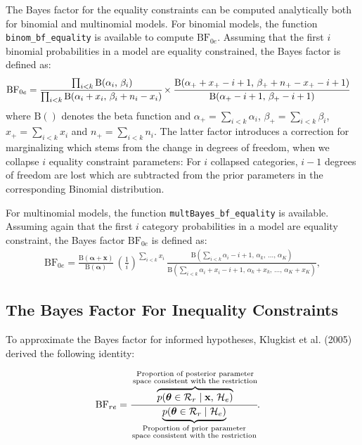 \documentclass[
  english,
  man,floatsintext]{apa6}
\begin{document}
The Bayes factor for the equality constraints can be computed analytically both for binomial and multinomial models. For binomial models, the function \texttt{binom\_bf\_equality} is available to compute \(\text{BF}_{0e}\). Assuming that the first \(i\) binomial probabilities in a model are equality constrained, the Bayes factor is defined as:
\begin{align*}
\text{BF}_{0e}
&= \cfrac{\prod_{i < k} \text{B}(\alpha_i\text{, } \beta_i)}{\prod_{i < k} \text{B}(\alpha_i + x_i\text{, } \beta_i + n_i - x_i)} \times \cfrac{\text{B}(\alpha_+ + x_+ - i + 1\text{, } \beta_+ + n_+ - x_+ - i + 1)}{\text{B}(\alpha_+ - i + 1\text{, }\beta_+ - i + 1)}
\end{align*}
where \(\text{B}()\) denotes the beta function and \(\alpha_+ = \sum_{i<k}\alpha_i\), \(\beta_+ = \sum_{i<k}\beta_i\), \(x_+ = \sum_{i<k} x_i\) and \(n_+ = \sum_{i<k} n_i\). The latter factor introduces a correction for marginalizing which stems from the change in degrees of freedom, when we collapse \(i\) equality constraint parameters: For \(i\) collapsed categories, \(i - 1\) degrees of freedom are lost which are subtracted from the prior parameters in the corresponding Binomial distribution.

For multinomial models, the function \texttt{multBayes\_bf\_equality} is available. Assuming again that the first \(i\) category probabilities in a model are equality constraint, the Bayes factor \(\text{BF}_{0e}\) is defined as:
\begin{align*}
\text{BF}_{0e} = \frac{\text{B}(\boldsymbol{\alpha}+\mathbf{x})}{\text{B}(\boldsymbol{\alpha})} \, \left(\frac{1}{i}\right)^{\sum_{i<k} x_i}\,\frac{
 \text{B}\left(\sum_{i<k}\alpha_i - i + 1\text{, }\alpha_{k}\text{, }\dots\text{, }\alpha_K\right)}{\text{B}\left(\sum_{i<k}\alpha_i+x_i - i + 1\text{, }\alpha_{k}+x_{k}\text{, }\dots\text{, }\alpha_K+x_K\right)},
\end{align*}

\hypertarget{the-bayes-factor-for-inequality-constraints}{%
\subsection{The Bayes Factor For Inequality Constraints}\label{the-bayes-factor-for-inequality-constraints}}

To approximate the Bayes factor for informed hypotheses, Klugkist et al. (2005) derived the following identity:

\begin{align}
\label{Eq:klugkistIdentity}
\text{BF}_{re} &= \cfrac{\overbrace{p(\boldsymbol{\theta} \in \mathcal{R}_r \mid \mathbf{x}\text{, }\mathcal{H}_e)}^{\substack{\text{Proportion of posterior parameter}\\\text{space consistent with the restriction}}}}{\underbrace{p(\boldsymbol{\theta} \in \mathcal{R}_r \mid  \mathcal{H}_e)}_{\substack{\text{Proportion of prior parameter}\\\text{space consistent with the restriction}}}}.
\end{align}
\end{document}
